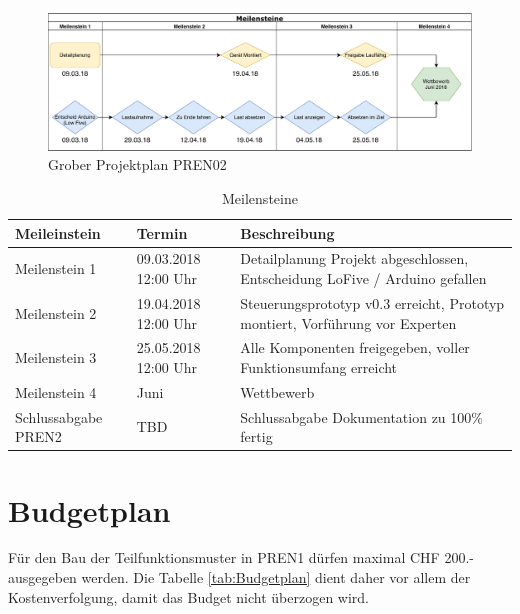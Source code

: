 \documentclass[a4paper]{report}
\begin{document}
\begin{figure}[h!]
	\includegraphics[width=\linewidth,keepaspectratio]{Rahmenplan}
	\caption{Grober Projektplan PREN02}
	\label{fig:GrobProjekt}
\end{figure}

\begin{table}[h!]
\vspace{1em}
\noindent
\begin{tabular}{|p{}|p{}|p{}|}
	\hline
	\textbf{Meileinstein} & \textbf{Termin} & \textbf{Beschreibung} \\
	\hline
	Meilenstein 1 & 09.03.2018 12:00 Uhr & Detailplanung Projekt abgeschlossen, Entscheidung LoFive / Arduino gefallen\\
	\hline
	Meilenstein 2 & 19.04.2018 12:00 Uhr & Steuerungsprototyp v0.3 erreicht, Prototyp  montiert, Vorführung vor Experten\\
	\hline
	Meilenstein 3 & 25.05.2018 12:00 Uhr & Alle Komponenten freigegeben, voller Funktionsumfang erreicht\\
	\hline
	Meilenstein 4 & Juni & Wettbewerb\\
	\hline
	Schlussabgabe PREN2 & TBD & Schlussabgabe Dokumentation zu 100\% fertig \\
	\hline
	\end{tabular}
	\caption{Meilensteine}
	\label{tab:Meilensteine}
\end{table}

\newpage

\section{Budgetplan}
\label{sec:Budgetplan}
Für den Bau der Teilfunktionsmuster in PREN1 dürfen maximal CHF 200.- ausgegeben werden. Die Tabelle \ref{tab:Budgetplan} dient daher vor allem der Kostenverfolgung, damit das Budget nicht überzogen wird.
\end{document}
